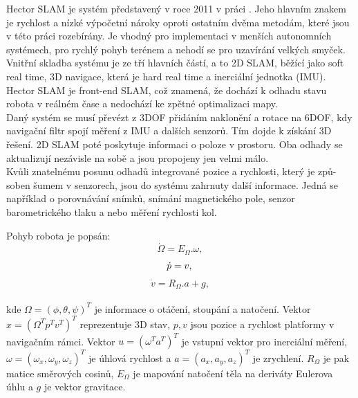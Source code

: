\documentclass[12pt]{report}
\begin{document}
Hector SLAM je systém představený v roce 2011 v práci \cite{Kohlbrecher2011}. Jeho hlavním znakem je rychlost a nízké výpočetní nároky oproti ostatním dvěma metodám, které jsou v této práci rozebírány. Je vhodný pro implementaci v menších autonomních systémech, pro rychlý pohyb terénem a nehodí se pro uzavírání velkých smyček.\\
\indent Vnitřní skladba systému je ze tří hlavních částí, a to 2D SLAM, běžící jako soft real time, 3D navigace, která je hard real time a inerciální jednotka (IMU). Hector SLAM je front-end SLAM, což znamená, že dochází k odhadu stavu robota v reálném čase a nedochází ke zpětné optimalizaci mapy.\\
\indent Daný systém se musí převézt z 3DOF přidáním naklonění a rotace na 6DOF, kdy navigační filtr spojí měření z IMU a dalších senzorů. Tím dojde k získání 3D řešení. 2D SLAM poté poskytuje informaci o poloze v prostoru. Oba odhady se aktualizují nezávisle na sobě a jsou propojeny jen velmi málo.\\
\indent Kvůli znatelnému posunu odhadů integrované pozice a rychlosti, který je způ-\\soben šumem v senzorech, jsou do systému zahrnuty další informace. Jedná se například o porovnávání snímků, snímání magnetického pole, senzor barometrického tlaku a nebo měření rychlosti kol.

Pohyb robota je popsán:
\begin{equation}
	\dot{\Omega}=E_\Omega.\omega,
\end{equation}
\begin{equation}
	\dot{p}=v,\\
\end{equation}
\begin{equation}
	\dot{v}=R_\Omega.a+g,
\end{equation}\\
kde $\Omega=(\phi,\theta,\psi)^T$ je informace o otáčení, stoupání a natočení. Vektor $x=(\Omega^T p^T v^T)^T$ reprezentuje 3D stav, $p,v$ jsou pozice a rychlost platformy v navigačním rámci. Vektor $u=(\omega^T a^T)^T$ je vstupní vektor pro inerciální měření, $\omega=(\omega_x,\omega_y,\omega_z)^T$ je úhlová rychlost a $a=(a_x,a_y,a_z)^T$ je zrychlení. $R_\Omega$ je pak matice směrových cosinů, $E_\Omega$ je mapování natočení těla na deriváty Eulerova úhlu a $g$ je vektor gravitace.\\
\end{document}
